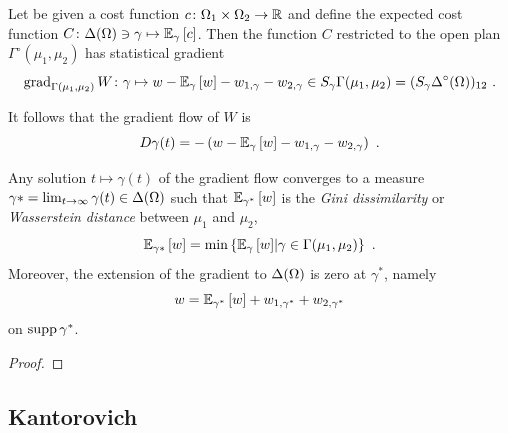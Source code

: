 \documentclass[runningheads]{llncs}
\begin{document}
\begin{proposition}Let be given a cost function $c \colon \Omega_1 \times \Omega_2 \to \mathbb R$ and define the expected cost function $C \colon \Delta(\Omega) \ni \gamma \mapsto {\operatorname{\mathbb E}}_{\gamma}\left[c\right]$. Then the function $C$ restricted to the open plan $\Gamma^\circ(\mu_1,\mu_2)$ has statistical gradient
%
\begin{equation*}
 \operatorname{grad}_{\Gamma(\mu_1,\mu_2)} W \colon \gamma \mapsto w - {\operatorname{\mathbb E}}_{\gamma}\left[w\right] - w_{1,\gamma} - w_{2,\gamma} \in S_\gamma\Gamma(\mu_1,\mu_2) = (S_\gamma \Delta^\circ(\Omega))_{12} \ . 
\end{equation*}

It follows that the gradient flow of $W$ is
%
\begin{equation*}
  D\gamma(t) = - \left(w - {\operatorname{\mathbb E}}_{\gamma}\left[w\right] - w_{1,\gamma} - w_{2,\gamma}\right) \ .
\end{equation*}

Any solution $t \mapsto \gamma(t)$ of the gradient flow converges to a measure $\gamma* = \lim_{t \to \infty} \gamma(t) \in \Delta(\Omega)$ such that ${\operatorname{\mathbb E}}_{\gamma^*}\left[w\right]$ is the \emph{Gini dissimilarity} or \emph{Wasserstein distance} between $\mu_1$ and $\mu_2$,
%
\begin{equation*}
  {\operatorname{\mathbb E}}_{\gamma*}\left[w\right] = \min \left\{ {\operatorname{\mathbb E}}_{\gamma}\left[w\right] \middle|  \gamma \in \Gamma(\mu_1,\mu_2) \right\} \ .
\end{equation*}
%
 Moreover, the extension of the gradient to $\Delta(\Omega)$ is zero at $\gamma^*$, namely
%
\begin{equation*}
  w = {\operatorname{\mathbb E}}_{\gamma^*}\left[w\right] + w_{1,\gamma^*} + w_{2,\gamma^*}
\end{equation*}
%
on $\operatorname{supp}{\gamma^*}$.
\end{proposition}

\begin{proof}
  
\end{proof}

\subsection{Kantorovich}

\end{document}
